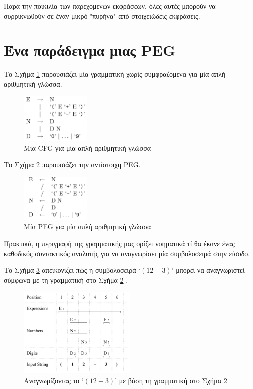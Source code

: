 \documentclass[diploma]{softlab-thesis}
\begin{document}
Παρά την ποικιλία των παρεχόμενων εκφράσεων, όλες αυτές μπορούν να συρρικνωθούν σε έναν μικρό "πυρήνα" από στοιχειώδεις εκφράσεις.

\section{Ένα παράδειγμα μιας PEG}

Το Σχήμα \ref{fig:cfg_example} παρουσιάζει μία γραμματική χωρίς συμφραζόμενα για μία απλή αριθμητική γλώσσα. 

\begin{figure}[h]
    \centering
    \includegraphics[width=0.3\textwidth]{pics/cfg_example}
    \caption{Μία CFG για μία απλή αριθμητική γλώσσα}
    \label{fig:cfg_example}
\end{figure}

Το Σχήμα \ref{fig:peg_example} παρουσιάζει την αντίστοιχη PEG.

\begin{figure}[h]
    \centering
    \includegraphics[width=0.3\textwidth]{pics/peg_example}
    \caption{Μία PEG για μία απλή αριθμητική γλώσσα}
    \label{fig:peg_example}
\end{figure}

Πρακτικά, η περιγραφή της γραμματικής μας ορίζει νοηματικά τί θα έκανε ένας καθοδικός συντακτικός αναλυτής για να αναγνωρίσει μία συμβολοσειρά στην είσοδο.

Το Σχήμα \ref{fig:peg_parse_example} απεικονίζει πώς η συμβολοσειρά `$(12-3)$' μπορεί να αναγνωριστεί σύμφωνα με τη γραμματική στο Σχήμα \ref{fig:peg_example} \cite{Ford2002a}.

\begin{figure}[h]
    \centering
    \includegraphics[width=0.5\textwidth]{pics/peg_parse_example}
	\caption{Αναγνωρίζοντας το `$(12-3)$' με βάση τη γραμματική στο Σχήμα \ref{fig:peg_example}}
    \label{fig:peg_parse_example}
\end{figure}
\end{document}
